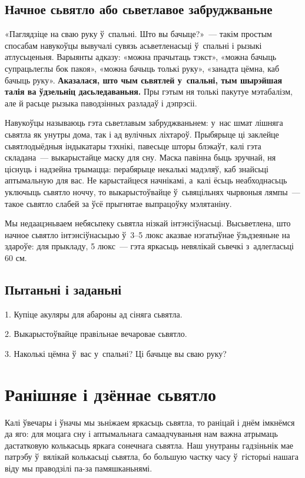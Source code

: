 \subsection*{Начное сьвятло або сьветлавое забруджваньне}

«Паглядзіце на сваю руку ў~спальні. Што вы бачыце?»~--- такім простым спосабам навукоўцы вывучалі сувязь асьветленасьці ў~спальні і рызыкі атлусьценьня. Варыянты адказу: «можна прачытаць тэкст», «можна бачыць супрацьлеглы бок пакоя», «можна бачыць толькі руку», «занадта цёмна, каб бачыць руку». \textbf{Аказалася, што чым сьвятлей у~спальні, тым шырэйшая талія ва ўдзельніц дасьледаваньня.} Пры гэтым ня толькі пакутуе мэтабалізм, але й расьце рызыка паводзінных разладаў і дэпрэсіі.

Навукоўцы называюць гэта сьветлавым забруджваньнем: у~нас шмат лішняга сьвятла як унутры дома, так і ад вулічных ліхтароў. Прыбярыце ці заклейце сьвятлодыёдныя індыкатары тэхнікі, павесьце шторы блэкаўт, калі гэта складана~--- выкарыстайце маску для сну. Маска павінна быць зручнай, ня ціснуць і надзейна трымацца: перабярыце некалькі мадэляў, каб знайсьці аптымальную для вас. Не карыстайцеся начнікамі, а~калі ёсьць неабходнасьць уключыць сьвятло ноччу, то выкарыстоўвайце ў~сьвяцільнях чырвоныя лямпы~--- такое сьвятло слабей за ўсё прыгнятае выпрацоўку мэлятаніну.

Мы недаацэньваем небясьпеку сьвятла нізкай інтэнсіўнасьці. Высьветлена, што начное сьвятло інтэнсіўнасьцью ў~3--5 люкс аказвае нэгатыўнае ўзьдзеяньне на здароўе: для прыкладу, 5 люкс~--- гэта яркасьць невялікай сьвечкі з~адлегласьці 60 см.

\subsection*{Пытаньні і заданьні}

1. Купіце акуляры для абароны ад сіняга сьвятла.

2. Выкарыстоўвайце правільнае вечаровае сьвятло.

3. Наколькі цёмна ў~вас у~спальні? Ці бачыце вы сваю руку?


\section{Ранішняе і дзённае сьвятло}

Калі ўвечары і ўначы мы зьніжаем яркасьць сьвятла, то раніцай і днём імкнёмся да яго: для моцага сну і аптымальнага самаадчуваньня нам важна атрымаць дастатковую колькасьць яркага сонечнага сьвятла. Наш унутраны гадзіньнік мае патрэбу ў~вялікай колькасьці сьвятла, бо большую частку часу ў~гісторыі нашага віду мы праводзілі па-за памяшканьнямі.

